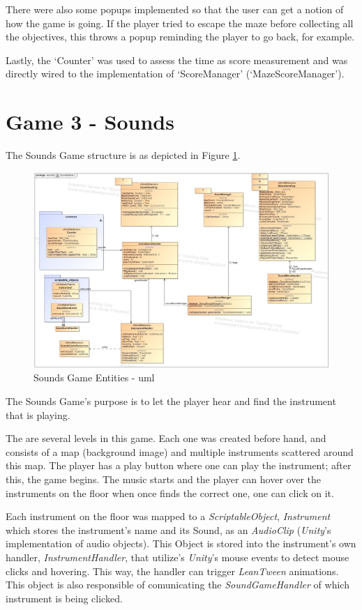 There were also some popups implemented so that the user can get a notion of how the game is going. If the player tried to escape the maze before collecting all the objectives, this throws a popup reminding the player to go back, for example.

Lastly, the `Counter' was used to assess the time as score measurement and was directly wired to the implementation of `ScoreManager' (`MazeScoreManager').

\newpage
\section{Game 3 - Sounds}
\label{arqSounds}

The Sounds Game structure is as depicted in Figure \ref{fig:soundsGameArq}.

\begin{figure}[!h]
    \centering
    \includegraphics[width=\linewidth]{Chapters/new_architechture/class__sounds__SoundsGame.jpg}
    \caption{Sounds Game Entities - \gls{uml}}
    \label{fig:soundsGameArq}
\end{figure}

The Sounds Game's purpose is to let the player hear and find the instrument that is playing.

The are several levels in this game. Each one was created before hand, and consists of a map (background image) and multiple instruments scattered around this map. The player has a play button where one can play the instrument; after this, the game begins. The music starts and the player can hover over the instruments on the floor when once finds the correct one, one can click on it.

Each instrument on the floor was mapped to a \textit{ScriptableObject}, \textit{Instrument} which stores the instrument's name and its Sound, as an \textit{AudioClip} (\textit{Unity}'s implementation of audio objects). This Object is stored into the instrument's own handler, \textit{InstrumentHandler}, that utilize's \textit{Unity}'s mouse events to detect mouse clicks and hovering. This way, the handler can trigger \textit{LeanTween} animations. This object is also responsible of comunicating the \textit{SoundGameHandler} of which instrument is being clicked.

